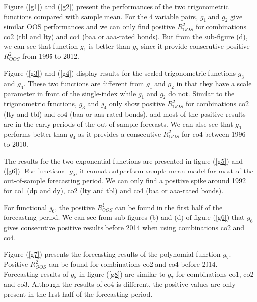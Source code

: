 \documentclass[a4paper,12pt,times,numbered,print,index]{report}
\numberwithin{equation}{section}
\begin{document}
Figure (\ref{g1}) and (\ref{g2}) present the performances of the two trigonometric functions compared with sample mean. For the 4 variable pairs, $g_1$ and $g_2$ give similar OOS performances and we can only find positive $R^2_{OOS}$ for combinations co2 (tbl and lty) and co4 (baa or aaa-rated bonds). But from the sub-figure (d), we can see that function $g_1$ is better than $g_2$ since it provide consecutive positive $R^2_{OOS}$ from 1996 to 2012.

Figure (\ref{g3}) and (\ref{g4}) display results for the scaled trigonometric functions $g_3$ and $g_4$. These two functions are different from $g_1$ and $g_2$ in that they have a scale parameter in front of the single-index while $g_1$ and $g_2$ do not. 
Similar to the trigonometric functions, $g_3$ and $g_4$ only show positive $R^2_{OOS}$ for combinations co2 (lty and tbl) and co4 (baa or aaa-rated bonds), and most of the positive results are in the early periods of the out-of-sample forecasts. We can also see that $g_3$ performs better than $g_4$ as it provides a consecutive $R^2_{OOS}$ for co4 between 1996 to 2010.

The results for the two exponential functions are presented in figure (\ref{g5}) and (\ref{g6}). For functional $g_5$, it cannot outperform sample mean model for most of the out-of-sample forecasting period. We can only find a positive spike around 1992 for co1 (dp and dy), co2 (lty and tbl) and co4 (baa or aaa-rated bonds). 

For functional $g_6$, the positive $R^2_{OOS}$ can be found in the first half of the forecasting period. We can see from sub-figures (b) and (d) of figure (\ref{g6}) that $g_6$ gives consecutive positive results before 2014 when using combinations co2 and co4. 

Figure (\ref{g7}) presents the forecasting results of the polynomial function $g_7$. Positive $R^2_{OOS}$ can be found for combinations co2 and co4 before 2014. Forecasting results of $g_8$ in figure (\ref{g8}) are similar to $g_7$ for combinations co1, co2 and co3. Although the results of co4 is different, the positive values are only present in the first half of the forecasting period. 
\end{document}
